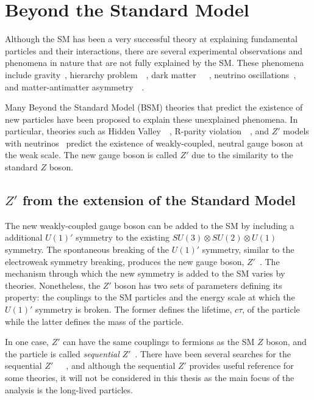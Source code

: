 \section{Beyond the Standard Model}
\label{sec:intro:bsm}

Although the SM has been a very successful theory at explaining fundamental particles and their interactions, there are several experimental observations and phenomena in nature that are not fully explained by the SM. These phenomena include gravity~\cite{PhysRevD.69.105009}, hierarchy problem~\cite{Magg:875284}~\cite{Magg:133759}, dark matter~\cite{Alpigiani:2281629}~\cite{bertone2005particle}~\cite{clowe2006direct}, neutrino oscillations~\cite{ahn2003indications}, and matter-antimatter asymmetry~\cite{toussaint1979matter}~\cite{dine2003origin}. 

Many Beyond the Standard Model (BSM) theories that predict the existence of new particles have been proposed to explain these unexplained phenomena. In particular, theories such as Hidden Valley~\cite{strassler2007echoes}~\cite{cassel2010electroweak}, R-parity violation~\cite{senjanovic1975exact}~\cite{mohapatra1981neutrino}, and $Z'$ models with neutrinos~\cite{Basso:2008iv} predict the existence of weakly-coupled, neutral gauge boson at the weak scale. The new gauge boson is called $Z'$ due to the similarity to the standard $Z$ boson. 

\subsection{\texorpdfstring{$Z'$}{Z'} from the extension of the Standard Model}
\label{sec:intro:zprime_extension}

The new weakly-coupled gauge boson can be added to the SM by including a additional $U(1)'$ symmetry to the existing $SU(3) \otimes SU(2) \otimes U(1)$ symmetry. The spontaneous breaking of the $U(1)'$ symmetry, similar to the electroweak symmetry breaking, produces the new gauge boson, $Z'$~\cite{Langacker:2008yv}. The mechanism through which the new symmetry is added to the SM varies by theories. Nonetheless, the $Z'$ boson has two sets of parameters defining its property: the couplings to the SM particles and the energy scale at which the $U(1)'$ symmetry is broken. The former defines the lifetime, $c\tau$, of the particle while the latter defines the mass of the particle.

In one case, $Z'$ can have the same couplings to fermions as the SM $Z$ boson, and the particle is called \textit{sequential} $Z'$~\cite{BARGER1980377}. There have been several searches for the sequential $Z'$~\cite{PhysRevD.86.095010}~\cite{ABAZOV201188}~\cite{PhysRevD.90.052005}, and although the sequential $Z'$ provides useful reference for some theories, it will not be considered in this thesis as the main focus of the analysis is the long-lived particles.

